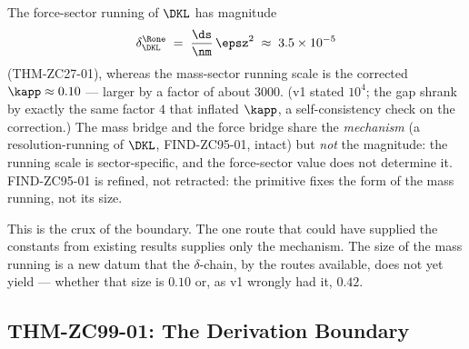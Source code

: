 \documentclass[12pt, a4paper]{article}
\begin{document}
\begin{formalbox}[title={FIND-ZC99-03: Shared Mechanism, Sector-Specific
  Magnitude (v2: gap $\sim3000\times$)}]
The force-sector running of $\DKL$ has magnitude
\[
  \delta_{\DKL}^{\Rone} \;=\; \frac{\ds}{\nm}\,\epsz^{2}
       \;\approx\; 3.5\times10^{-5}
\]
(THM-ZC27-01), whereas the mass-sector running scale is the corrected
$\kapp\approx0.10$ --- larger by a factor of about $3000$. (v1 stated $10^4$;
the gap shrank by exactly the same factor $4$ that inflated $\kapp$, a
self-consistency check on the correction.) The mass bridge and the force bridge
share the \emph{mechanism} (a resolution-running of $\DKL$, FIND-ZC95-01, intact)
but \emph{not} the magnitude: the running scale is sector-specific, and the
force-sector value does not determine it. FIND-ZC95-01 is refined, not retracted:
the primitive fixes the form of the mass running, not its size.
\end{formalbox}

This is the crux of the boundary. The one route that could have supplied the
constants from existing results supplies only the mechanism. The size of the
mass running is a new datum that the $\delta$-chain, by the routes available,
does not yet yield --- whether that size is $0.10$ or, as v1 wrongly had it,
$0.42$.


\subsection{THM-ZC99-01: The Derivation Boundary}
\label{sec:boundary-zc99}
\end{document}
